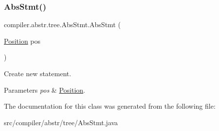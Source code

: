 \subsubsection{\texorpdfstring{Abs\+Stmt()}{AbsStmt()}}
{\footnotesize\ttfamily compiler.\+abstr.\+tree.\+Abs\+Stmt.\+Abs\+Stmt (\begin{DoxyParamCaption}\item[{\hyperlink{classcompiler_1_1_position}{Position}}]{pos }\end{DoxyParamCaption})}

Create new statement.


\begin{DoxyParams}{Parameters}
{\em pos} & \hyperlink{classcompiler_1_1_position}{Position}. \\
\hline
\end{DoxyParams}


The documentation for this class was generated from the following file\+:\begin{DoxyCompactItemize}
\item 
src/compiler/abstr/tree/Abs\+Stmt.\+java\end{DoxyCompactItemize}
